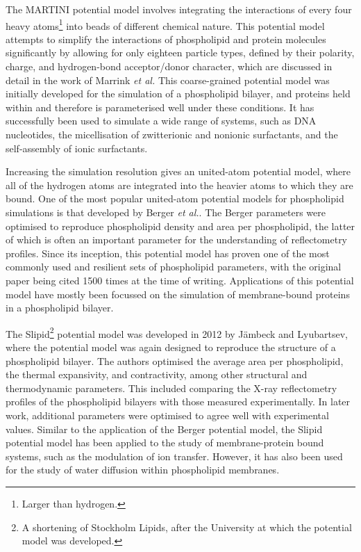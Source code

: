 The MARTINI potential model involves integrating the interactions of every four heavy atoms\footnote{Larger than hydrogen.} into beads of different chemical nature.
This potential model attempts to simplify the interactions of phospholipid and protein molecules significantly by allowing for only eighteen particle types, defined by their polarity, charge, and hydrogen-bond acceptor/donor character, which are discussed in detail in the work of Marrink \emph{et al.}
This coarse-grained potential model was initially developed for the simulation of a phospholipid bilayer, and proteins held within and therefore is parameterised well under these conditions.
It has successfully been used to simulate a wide range of systems, such as DNA nucleotides, the micellisation of zwitterionic and nonionic surfactants, and the self-assembly of ionic surfactants.

Increasing the simulation resolution gives an united-atom potential model, where all of the hydrogen atoms are integrated into the heavier atoms to which they are bound.
One of the most popular united-atom potential models for phospholipid simulations is that developed by Berger \emph{et al.}.
The Berger parameters were optimised to reproduce phospholipid density and area per phospholipid, the latter of which is often an important parameter for the understanding of reflectometry profiles.
Since its inception, this potential model has proven one of the most commonly used and resilient sets of phospholipid parameters, with the original paper being cited 1500 times at the time of writing.
Applications of this potential model have mostly been focussed on the simulation of membrane-bound proteins in a phospholipid bilayer.

The Slipid\footnote{A shortening of Stockholm Lipids, after the University at which the potential model was developed.} potential model was developed in 2012 by J\"{a}mbeck and Lyubartsev, where the potential model was again designed to reproduce the structure of a phospholipid bilayer.
The authors optimised the average area per phospholipid, the thermal expansivity, and contractivity, among other structural and thermodynamic parameters.
This included comparing the X-ray reflectometry profiles of the phospholipid bilayers with those measured experimentally.
In later work, additional parameters were optimised to agree well with experimental values.
Similar to the application of the Berger potential model, the Slipid potential model has been applied to the study of membrane-protein bound systems, such as the modulation of ion transfer.
However, it has also been used for the study of water diffusion within phospholipid membranes.

